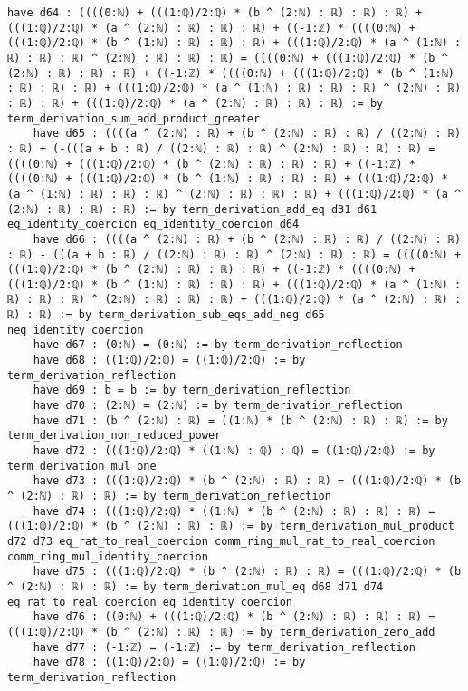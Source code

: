 \documentclass{article}
\begin{document}
\begin{tcolorbox}[colback=white!10, width=\linewidth]
\begin{lstlisting}[language=Lean4]
    have d64 : ((((0:ℕ) + (((1:ℚ)/2:ℚ) * (b ^ (2:ℕ) : ℝ) : ℝ) : ℝ) + (((1:ℚ)/2:ℚ) * (a ^ (2:ℕ) : ℝ) : ℝ) : ℝ) + ((-1:ℤ) * ((((0:ℕ) + (((1:ℚ)/2:ℚ) * (b ^ (1:ℕ) : ℝ) : ℝ) : ℝ) + (((1:ℚ)/2:ℚ) * (a ^ (1:ℕ) : ℝ) : ℝ) : ℝ) ^ (2:ℕ) : ℝ) : ℝ) : ℝ) = ((((0:ℕ) + (((1:ℚ)/2:ℚ) * (b ^ (2:ℕ) : ℝ) : ℝ) : ℝ) + ((-1:ℤ) * ((((0:ℕ) + (((1:ℚ)/2:ℚ) * (b ^ (1:ℕ) : ℝ) : ℝ) : ℝ) + (((1:ℚ)/2:ℚ) * (a ^ (1:ℕ) : ℝ) : ℝ) : ℝ) ^ (2:ℕ) : ℝ) : ℝ) : ℝ) + (((1:ℚ)/2:ℚ) * (a ^ (2:ℕ) : ℝ) : ℝ) : ℝ) := by term_derivation_sum_add_product_greater
    have d65 : ((((a ^ (2:ℕ) : ℝ) + (b ^ (2:ℕ) : ℝ) : ℝ) / ((2:ℕ) : ℝ) : ℝ) + (-(((a + b : ℝ) / ((2:ℕ) : ℝ) : ℝ) ^ (2:ℕ) : ℝ) : ℝ) : ℝ) = ((((0:ℕ) + (((1:ℚ)/2:ℚ) * (b ^ (2:ℕ) : ℝ) : ℝ) : ℝ) + ((-1:ℤ) * ((((0:ℕ) + (((1:ℚ)/2:ℚ) * (b ^ (1:ℕ) : ℝ) : ℝ) : ℝ) + (((1:ℚ)/2:ℚ) * (a ^ (1:ℕ) : ℝ) : ℝ) : ℝ) ^ (2:ℕ) : ℝ) : ℝ) : ℝ) + (((1:ℚ)/2:ℚ) * (a ^ (2:ℕ) : ℝ) : ℝ) : ℝ) := by term_derivation_add_eq d31 d61 eq_identity_coercion eq_identity_coercion d64
    have d66 : ((((a ^ (2:ℕ) : ℝ) + (b ^ (2:ℕ) : ℝ) : ℝ) / ((2:ℕ) : ℝ) : ℝ) - (((a + b : ℝ) / ((2:ℕ) : ℝ) : ℝ) ^ (2:ℕ) : ℝ) : ℝ) = ((((0:ℕ) + (((1:ℚ)/2:ℚ) * (b ^ (2:ℕ) : ℝ) : ℝ) : ℝ) + ((-1:ℤ) * ((((0:ℕ) + (((1:ℚ)/2:ℚ) * (b ^ (1:ℕ) : ℝ) : ℝ) : ℝ) + (((1:ℚ)/2:ℚ) * (a ^ (1:ℕ) : ℝ) : ℝ) : ℝ) ^ (2:ℕ) : ℝ) : ℝ) : ℝ) + (((1:ℚ)/2:ℚ) * (a ^ (2:ℕ) : ℝ) : ℝ) : ℝ) := by term_derivation_sub_eqs_add_neg d65 neg_identity_coercion
    have d67 : (0:ℕ) = (0:ℕ) := by term_derivation_reflection
    have d68 : ((1:ℚ)/2:ℚ) = ((1:ℚ)/2:ℚ) := by term_derivation_reflection
    have d69 : b = b := by term_derivation_reflection
    have d70 : (2:ℕ) = (2:ℕ) := by term_derivation_reflection
    have d71 : (b ^ (2:ℕ) : ℝ) = ((1:ℕ) * (b ^ (2:ℕ) : ℝ) : ℝ) := by term_derivation_non_reduced_power
    have d72 : (((1:ℚ)/2:ℚ) * ((1:ℕ) : ℚ) : ℚ) = ((1:ℚ)/2:ℚ) := by term_derivation_mul_one
    have d73 : (((1:ℚ)/2:ℚ) * (b ^ (2:ℕ) : ℝ) : ℝ) = (((1:ℚ)/2:ℚ) * (b ^ (2:ℕ) : ℝ) : ℝ) := by term_derivation_reflection
    have d74 : (((1:ℚ)/2:ℚ) * ((1:ℕ) * (b ^ (2:ℕ) : ℝ) : ℝ) : ℝ) = (((1:ℚ)/2:ℚ) * (b ^ (2:ℕ) : ℝ) : ℝ) := by term_derivation_mul_product d72 d73 eq_rat_to_real_coercion comm_ring_mul_rat_to_real_coercion comm_ring_mul_identity_coercion
    have d75 : (((1:ℚ)/2:ℚ) * (b ^ (2:ℕ) : ℝ) : ℝ) = (((1:ℚ)/2:ℚ) * (b ^ (2:ℕ) : ℝ) : ℝ) := by term_derivation_mul_eq d68 d71 d74 eq_rat_to_real_coercion eq_identity_coercion
    have d76 : ((0:ℕ) + (((1:ℚ)/2:ℚ) * (b ^ (2:ℕ) : ℝ) : ℝ) : ℝ) = (((1:ℚ)/2:ℚ) * (b ^ (2:ℕ) : ℝ) : ℝ) := by term_derivation_zero_add
    have d77 : (-1:ℤ) = (-1:ℤ) := by term_derivation_reflection
    have d78 : ((1:ℚ)/2:ℚ) = ((1:ℚ)/2:ℚ) := by term_derivation_reflection

\end{lstlisting}
\end{tcolorbox}
\end{document}
